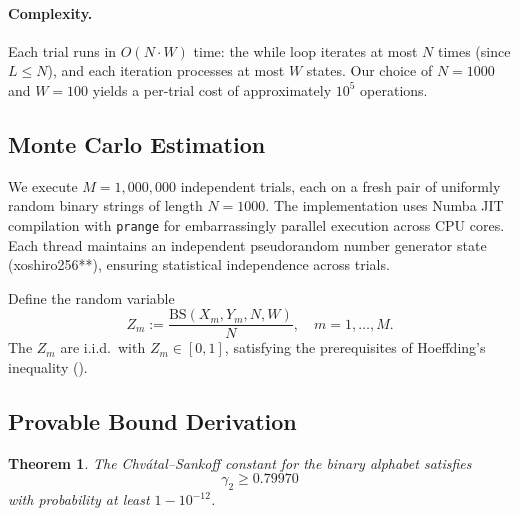 \documentclass[11pt,a4paper]{article}
\newtheorem{theorem}{Theorem}
\theoremstyle{definition}
\newcommand{\BS}{\mathrm{BS}}
\begin{document}
\paragraph{Complexity.} Each trial runs in $O(N \cdot W)$ time: the while loop
iterates at most $N$ times (since $L \leq N$), and each iteration processes at
most $W$ states. Our choice of $N = 1000$ and $W = 100$ yields a per-trial cost
of approximately $10^5$ operations.

\subsection{Monte Carlo Estimation}
\label{sec:monte_carlo}

We execute $M = 1{,}000{,}000$ independent trials, each on a fresh pair of
uniformly random binary strings of length $N = 1000$. The implementation uses
Numba JIT compilation \citep{lam2015} with \texttt{prange} for embarrassingly
parallel execution across CPU cores. Each thread maintains an independent
pseudorandom number generator state (xoshiro256**), ensuring statistical
independence across trials.

Define the random variable
\begin{equation}
  Z_m := \frac{\BS(X_m, Y_m, N, W)}{N}, \quad m = 1, \ldots, M.
  \label{eq:Z_m}
\end{equation}
The $Z_m$ are i.i.d.\ with $Z_m \in [0, 1]$, satisfying the prerequisites of
Hoeffding's inequality ().

\subsection{Provable Bound Derivation}
\label{sec:proof}

\begin{theorem}
  \label{thm:main}
  The Chv\'{a}tal--Sankoff constant for the binary alphabet satisfies
  \begin{equation}
    \gamma_2 \geq 0.79970
    \label{eq:main_result}
  \end{equation}
  with probability at least $1 - 10^{-12}$.
\end{theorem}
\end{document}
